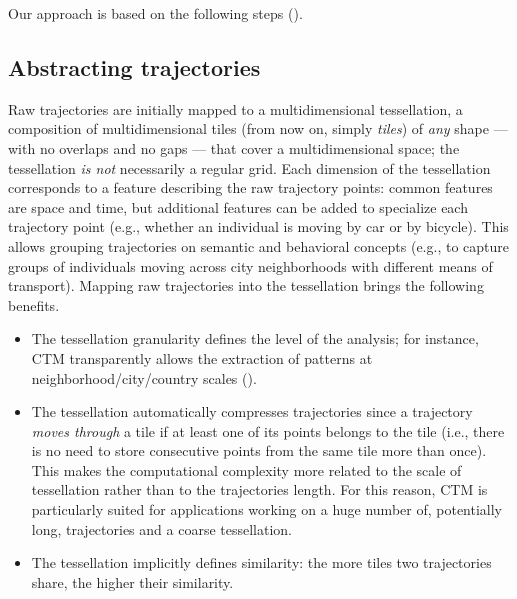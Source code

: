 \documentclass[preprint,12pt,authoryear]{elsarticle} %
\begin{document}
Our approach is based on the following steps ().

\subsection{Abstracting trajectories}
Raw trajectories are initially mapped to a multidimensional tessellation, a composition of multidimensional tiles (from now on, simply \textit{tiles}) of \textit{any} shape --- with no overlaps and no gaps --- that cover a multidimensional space; the tessellation \textit{is not} necessarily a regular grid.
Each dimension of the tessellation corresponds to a feature describing the raw trajectory points: common features are space and time, but additional features can be added to specialize each trajectory point (e.g., whether an individual is moving by car or by bicycle).
This allows grouping trajectories on semantic and behavioral concepts (e.g., to capture groups of individuals moving across city neighborhoods with different means of transport).
Mapping raw trajectories into the tessellation brings the following benefits.
\begin{itemize}
    \item The tessellation granularity defines the level of the analysis; for instance, CTM transparently allows the extraction of patterns at neighborhood/city/country scales ().
    \item The tessellation automatically compresses trajectories since a trajectory \textit{moves through} a tile if at least one of its points belongs to the tile (i.e., there is no need to store consecutive points from the same tile more than once). This makes the computational complexity more related to the scale of tessellation rather than to the trajectories length. For this reason, CTM is particularly suited for applications working on a huge number of, potentially long, trajectories and a coarse tessellation.
    \item The tessellation implicitly defines similarity: the more tiles two trajectories share, the higher their similarity.
\end{itemize}
\end{document}
